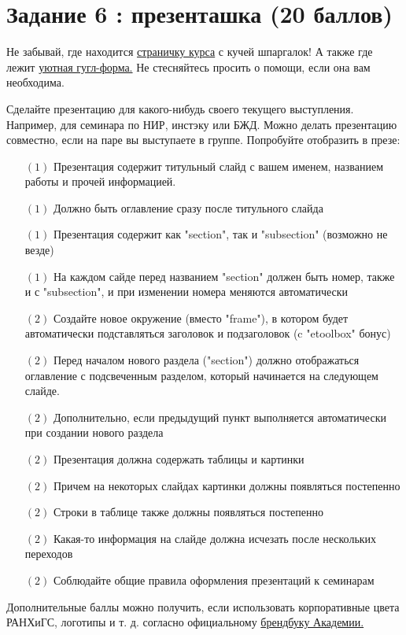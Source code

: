 \documentclass[12pt, a4paper, oneside]{article}
\begin{document}
\section*{Задание 6 :  презенташка  (20  баллов) }

Не забывай, где находится  \href{https://fulyankin.github.io/LaTeX/}{страничку курса} с кучей шпаргалок! А также где лежит \href{https://docs.google.com/forms/d/e/1FAIpQLSe11kxKVfv07iCL1E9yNX7ll9swKImiVwRr1H70lslGzInRSg/viewform}{уютная гугл-форма.} Не стесняйтесь просить о помощи, если она вам необходима. 

Сделайте презентацию для какого-нибудь своего текущего выступления. Например, для семинара по НИР, инстэку или БЖД. Можно делать презентацию совместно, если на паре вы выступаете в группе. Попробуйте отобразить в презе: 

\begin{itemize}
	\item[$(1)$]   Презентация содержит титульный слайд с вашем именем, названием работы и прочей информацией.
	\item[$(1)$]   Должно быть оглавление сразу после титульного слайда
	\item[$(1)$]   Презентация содержит как "section", так и "subsection" (возможно не везде)
	\item[$(1)$]  На каждом сайде перед названием "section" должен быть номер, также и с "subsection", и при изменении номера меняются автоматически
	\item[$(2)$]  Создайте новое окружение (вместо "frame"), в котором будет автоматически подставляться заголовок и подзаголовок (c "etoolbox" бонус)
	\item[$(2)$]  Перед началом нового раздела ("section") должно отображаться оглавление с подсвеченным разделом, который начинается на следующем слайде.
	\item[$(2)$]  Дополнительно, если предыдущий пункт выполняется автоматически при создании нового раздела
	\item[$(2)$]  Презентация должна содержать таблицы и картинки
	\item[$(2)$]  Причем на некоторых слайдах картинки должны появляться постепенно
	\item[$(2)$]  Строки в таблице также должны появляться постепенно
	\item[$(2)$]  Какая-то информация на слайде должна исчезать после нескольких переходов
	\item[$(2)$]  Соблюдайте общие правила оформления презентаций к семинарам
\end{itemize}

Дополнительные баллы можно получить, если использовать корпоративные цвета РАНХиГС, логотипы и т. д. согласно официальному \href{https://www.ranepa.ru/zhurnalist/firmennyj-stil}{брендбуку Академии.}
\end{document}
